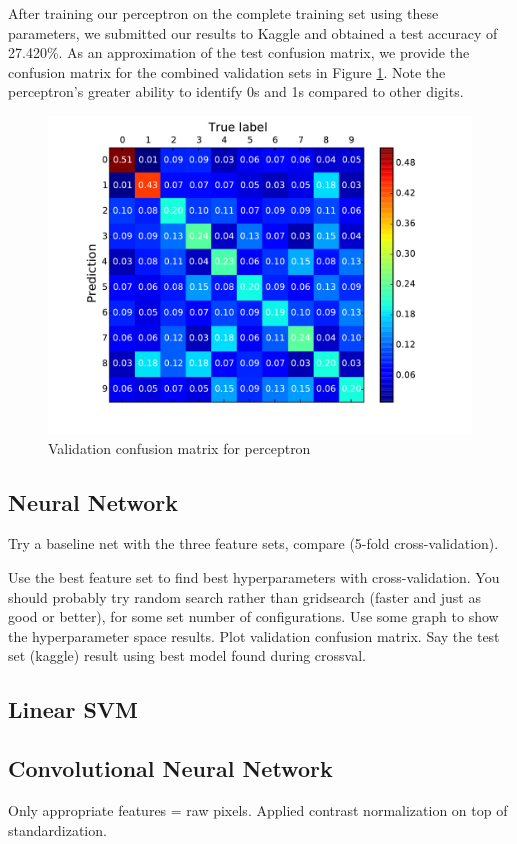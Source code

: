 \documentclass{acm_proc_article-sp}
\begin{document}
After training our perceptron on the complete training set using these parameters, we submitted our results to Kaggle and obtained a test accuracy of 27.420\%. As an approximation of the test confusion matrix, we provide the confusion matrix for the combined validation sets in Figure \ref{fig:perc-confusion}. Note the perceptron's greater ability to identify 0s and 1s compared to other digits.
\begin{figure}[h!]
	\centering
	\includegraphics[width=\linewidth]{perceptron_confusion}
  	\caption{Validation confusion matrix for perceptron}
  	\label{fig:perc-confusion}
\end{figure}

\subsection{Neural Network}
Try a baseline net with the three feature sets, compare (5-fold cross-validation).

Use the best feature set to find best hyperparameters with cross-validation. You should probably try random search rather than gridsearch (faster and just as good or better), for some set number of configurations. Use some graph to show the hyperparameter space results. Plot validation confusion matrix. Say the test set (kaggle) result using best model found during crossval.

\subsection{Linear SVM}

\subsection{Convolutional Neural Network}
Only appropriate features = raw pixels. Applied contrast normalization on top of standardization.
\end{document}
